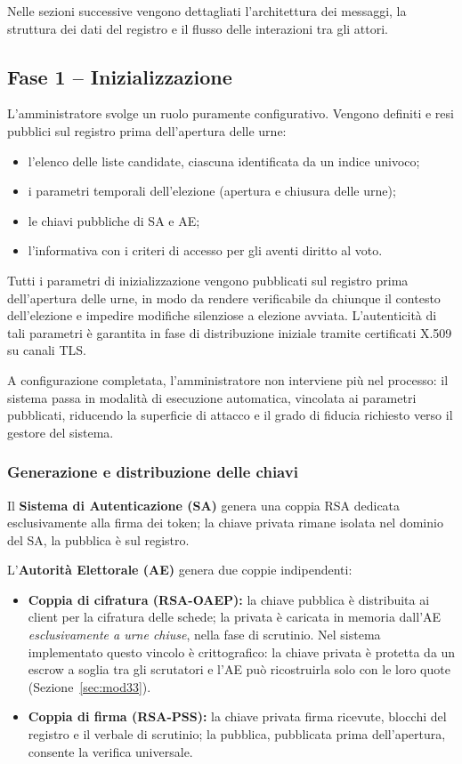 \documentclass[12pt,a4paper]{article}
\begin{document}
Nelle sezioni successive vengono dettagliati l'architettura dei messaggi, la struttura dei
dati del registro e il flusso delle interazioni tra gli attori.

\subsection{Fase 1 – Inizializzazione}

L'amministratore svolge un ruolo puramente configurativo. Vengono definiti e resi pubblici
sul registro prima dell'apertura delle urne:
\begin{itemize}
  \item l'elenco delle liste candidate, ciascuna identificata da un indice univoco;
  \item i parametri temporali dell'elezione (apertura e chiusura delle urne);
  \item le chiavi pubbliche di SA e AE;
  \item l'informativa con i criteri di accesso per gli aventi diritto al voto.
\end{itemize}

Tutti i parametri di inizializzazione vengono pubblicati sul registro prima dell'apertura
delle urne, in modo da rendere verificabile da chiunque il contesto dell'elezione e impedire
modifiche silenziose a elezione avviata. L'autenticità di tali parametri è garantita in fase
di distribuzione iniziale tramite certificati X.509 su canali TLS.

A configurazione completata, l'amministratore non interviene più nel processo: il sistema
passa in modalità di esecuzione automatica, vincolata ai parametri pubblicati, riducendo la
superficie di attacco e il grado di fiducia richiesto verso il gestore del sistema.

\subsubsection{Generazione e distribuzione delle chiavi}

Il \textbf{Sistema di Autenticazione (SA)} genera una coppia RSA dedicata esclusivamente
alla firma dei token; la chiave privata rimane isolata nel dominio del SA, la pubblica è
sul registro.

L'\textbf{Autorità Elettorale (AE)} genera due coppie indipendenti:
\begin{itemize}
  \item \textbf{Coppia di cifratura (RSA-OAEP):} la chiave pubblica è distribuita ai client
    per la cifratura delle schede; la privata è caricata in memoria dall'AE
    \emph{esclusivamente a urne chiuse}, nella fase di scrutinio. Nel sistema implementato
    questo vincolo è crittografico: la chiave privata è protetta da un escrow a soglia tra
    gli scrutatori e l'AE può ricostruirla solo con le loro quote (Sezione~\ref{sec:mod33}).
  \item \textbf{Coppia di firma (RSA-PSS):} la chiave privata firma ricevute, blocchi del
    registro e il verbale di scrutinio; la pubblica, pubblicata prima dell'apertura, consente
    la verifica universale.
\end{itemize}
\end{document}
